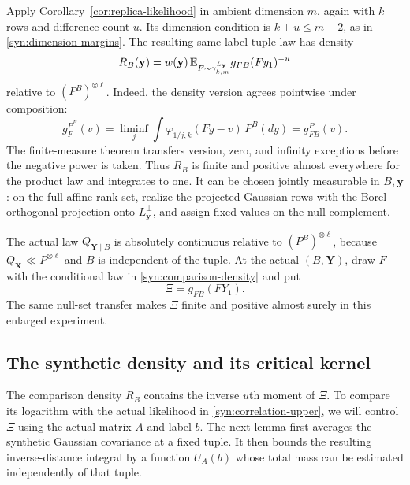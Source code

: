 Apply Corollary~\ref{cor:replica-likelihood} in ambient dimension \(m\),
again with \(k\) rows and difference count \(u\).  Its dimension condition
is \(k+u\le m-2\), as in \eqref{syn:dimension-margins}.  The resulting
same-label tuple law has density
\begin{equation}\label{syn:comparison-density}
 R_B(\mathbf y)
 =w(\mathbf y)\,
   \mathbb E_{F\sim\gamma_{k,m}^{L_{\mathbf y}}}g_{FB}(Fy_1)^{-u}
\end{equation}
relative to \((P^B)^{\otimes\ell}\).  Indeed, the density version agrees
pointwise under composition:
\begin{equation}\label{syn:composition-version}
 g_F^{P^B}(v)
 =\liminf_j\int\varphi_{1/j,k}(Fy-v)\,P^B(dy)
 =g_{FB}^{P}(v).
\end{equation}
The finite-measure theorem transfers version, zero, and infinity
exceptions before the negative power is taken.  Thus \(R_B\) is finite and
positive almost everywhere for the product law and integrates to one.
It can be chosen jointly measurable in \(B,\mathbf y\): on the
full-affine-rank set, realize the projected Gaussian rows with the Borel
orthogonal projection onto \(L_{\mathbf y}^{\perp}\), and assign fixed
values on the null complement.

The actual law \(Q_{\mathbf Y\mid B}\) is absolutely continuous relative
to \((P^B)^{\otimes\ell}\), because \(Q_{\mathbf X}\ll P^{\otimes\ell}\)
and \(B\) is independent of the tuple.  At the actual \((B,\mathbf Y)\),
draw \(F\) with the conditional law in \eqref{syn:comparison-density}
and put
\[
 \Xi=g_{FB}(FY_1).
\]
The same null-set transfer makes \(\Xi\) finite and positive almost surely
in this enlarged experiment.

\subsection{The synthetic density and its critical kernel}

The comparison density \(R_B\) contains the inverse \(u\)th moment of
\(\Xi\).  To compare its logarithm with the actual likelihood in
\eqref{syn:correlation-upper}, we will control \(\Xi\) using the actual
matrix \(A\) and label \(b\).  The next lemma first averages the synthetic
Gaussian covariance at a fixed tuple.  It then bounds the resulting
inverse-distance integral by a function \(U_A(b)\) whose total mass can
be estimated independently of that tuple.

